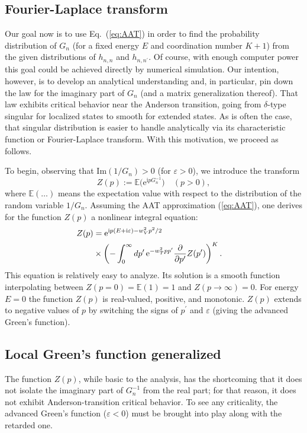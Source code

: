 \documentclass[aps,prl,twocolumn,letterpaper,superscriptaddress]{revtex4-2}
\begin{document}
\subsection{Fourier-Laplace transform}
Our goal now is to use Eq.\ (\ref{eq:AAT}) in order to find the probability distribution of $G_n$ (for a fixed energy $E$ and coordination number $K+1$) from the given distributions of $h_{n,n}$ and $h_{n,n^\prime}$. Of course, with enough computer power this goal could be achieved directly by numerical simulation. Our intention, however, is to develop an analytical understanding and, in particular, pin down the law for the imaginary part of $G_n$ (and a matrix generalization thereof). That law exhibits critical behavior near the Anderson transition, going from $\delta$-type singular for localized states to smooth for extended states. As is often the case, that singular distribution is easier to handle analytically via its characteristic function or Fourier-Laplace transform. With this motivation, we proceed as follows.

To begin, observing that $\mathrm{Im} (1/{G}_n) > 0$ (for $\varepsilon > 0$), we introduce the transform
\begin{equation}
    Z(p) := \mathbb{E} \big( \mathrm{e}^{\mathrm{i} p {G}_n^{-1}} \big) \quad (p > 0) ,
\end{equation}
where $\mathbb{E}(\ldots)$ means the expectation value with respect to the distribution of the random variable $1/{G}_n$. Assuming the AAT approximation (\ref{eq:AAT}), one derives \cite{AZ23} for the function $Z(p)$ a nonlinear integral equation:
 \begin{align}\label{eq:eqn4Z}
    Z(p) &= \mathrm{e}^{\mathrm{i}p(E + \mathrm{i}\varepsilon) - w_V^2 p^2 / 2 } \cr &\times \left( - \int\nolimits_{0}^{\infty} dp^\prime \, \mathrm{e}^{-w_T^2 p p^\prime} \frac{\partial}{\partial p^\prime} Z(p^\prime) \right)^{K} .
\end{align}
This equation is relatively easy to analyze. Its solution is a smooth function interpolating between $Z(p = 0) = \mathbb{E}(1) = 1$ and $Z(p \to \infty) = 0$. For energy $E = 0$ the function $Z(p)$ is real-valued, positive, and monotonic. $Z(p)$ extends to negative values of $p$ by switching the signs of $p^\prime$ and $\varepsilon$ (giving the advanced Green's function).

\subsection{Local Green's function generalized}
The function $Z(p)$, while basic to the analysis, has the shortcoming that it does not isolate the imaginary part of $G_n^{-1}$ from the real part; for that reason, it does not exhibit Anderson-transition critical behavior. To see any criticality, the advanced Green's function ($\varepsilon < 0$) must be brought into play along with the retarded one.
\end{document}
